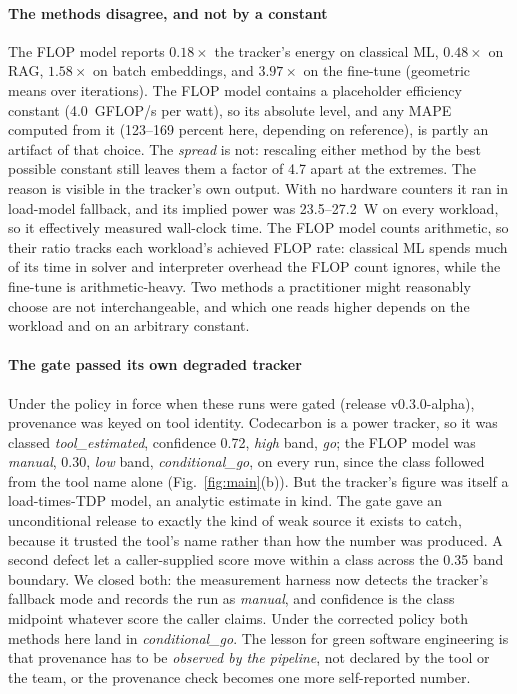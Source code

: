 \documentclass[10pt,conference]{IEEEtran}
\begin{document}
\paragraph{The methods disagree, and not by a constant} The FLOP model reports
$0.18\times$ the tracker's energy on classical ML, $0.48\times$ on RAG,
$1.58\times$ on batch embeddings, and $3.97\times$ on the fine-tune
(geometric means over iterations). The FLOP model contains a placeholder
efficiency constant (4.0~GFLOP/s per watt), so its absolute level, and any MAPE
computed from it (123--169 percent here, depending on reference), is partly an
artifact of that choice. The \emph{spread} is not: rescaling either method by
the best possible constant still leaves them a factor of 4.7 apart at the
extremes. The reason is visible in the tracker's own output. With no hardware
counters it ran in load-model fallback, and its implied power was 23.5--27.2~W
on every workload, so it effectively measured wall-clock time. The FLOP model
counts arithmetic, so their ratio tracks each workload's achieved FLOP rate:
classical ML spends much of its time in solver and interpreter overhead the
FLOP count ignores, while the fine-tune is arithmetic-heavy. Two methods a
practitioner might reasonably choose are not interchangeable, and which one
reads higher depends on the workload and on an arbitrary constant.

\paragraph{The gate passed its own degraded tracker} Under the
policy in force when these runs were gated (release v0.3.0-alpha), provenance
was keyed on tool identity. Codecarbon is a power tracker, so it was classed
\emph{tool\_estimated}, confidence 0.72, \emph{high} band, \emph{go}; the FLOP
model was \emph{manual}, 0.30, \emph{low} band, \emph{conditional\_go}, on every
run, since the class followed from the tool name alone
(Fig.~\ref{fig:main}(b)). But the tracker's figure was itself a
load-times-TDP model, an analytic estimate in kind. The gate gave an
unconditional release to exactly the kind of weak source it exists to catch,
because it trusted the tool's name rather than how the number was produced. A
second defect let a caller-supplied score move within a class across the 0.35
band boundary. We closed both: the measurement harness now detects the
tracker's fallback mode and records the run as \emph{manual}, and confidence is
the class midpoint whatever score the caller claims. Under the corrected policy
both methods here land in \emph{conditional\_go}. The lesson for green software
engineering is that provenance has to be \emph{observed by the pipeline}, not
declared by the tool or the team, or the provenance check becomes one more
self-reported number.
\end{document}
